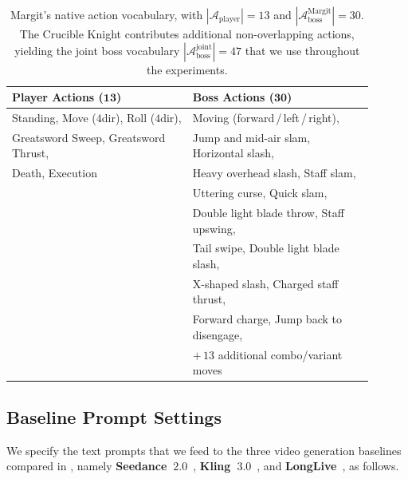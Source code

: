 \begin{table}[h]
  \caption{Margit's native action vocabulary, with $|\mathcal{A}_{\text{player}}|=13$ and $|\mathcal{A}_{\text{boss}}^{\text{Margit}}|=30$. The Crucible Knight contributes additional non-overlapping actions, yielding the joint boss vocabulary $|\mathcal{A}_{\text{boss}}^{\text{joint}}|=47$ that we use throughout the experiments.}
  \label{tab:vocab}
  \centering
  \small
  \begin{tabular}{p{0.45\linewidth}p{0.45\linewidth}}
    \toprule
    \textbf{Player Actions ($\mathbf{13}$)} & \textbf{Boss Actions ($\mathbf{30}$)} \\
    \midrule
    Standing, Move ($4$dir), Roll ($4$dir), & Moving (forward\,/\,left\,/\,right), \\
    Greatsword Sweep, Greatsword Thrust, & Jump and mid-air slam, Horizontal slash, \\
    Death, Execution & Heavy overhead slash, Staff slam, \\
    & Uttering curse, Quick slam, \\
    & Double light blade throw, Staff upswing, \\
    & Tail swipe, Double light blade slash, \\
    & X-shaped slash, Charged staff thrust, \\
    & Forward charge, Jump back to disengage, \\
    & $+\,13$ additional combo/variant moves \\
    \bottomrule
  \end{tabular}
\end{table}

\subsection{Baseline Prompt Settings}
\label{app:baseline_prompt}

We specify the text prompts that we feed to the three video generation baselines compared in , namely
\textbf{Seedance~$\mathbf{2.0}$}~\citep{seedance2026seedance20advancingvideo},
\textbf{Kling~$\mathbf{3.0}$}~\citep{kuaishou2026kling}, and
\textbf{LongLive}~\citep{yang2025longlive}, as follows.

